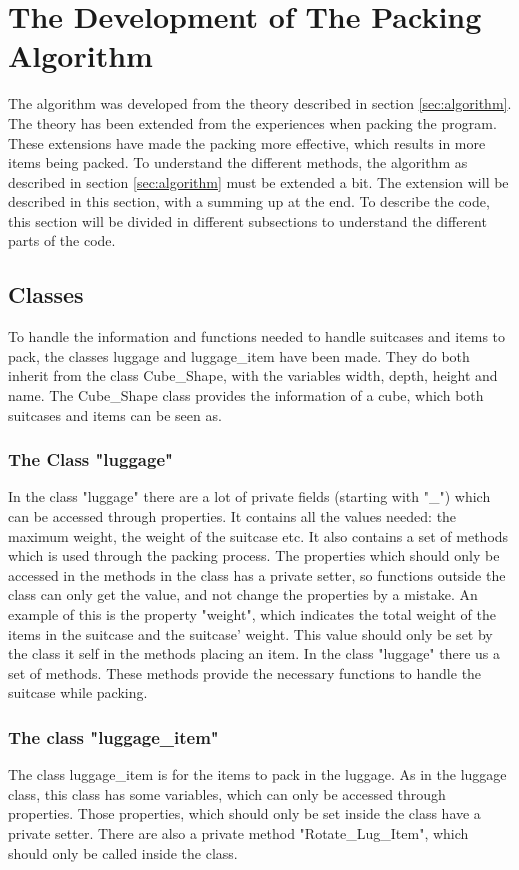 \section{The Development of The Packing Algorithm}
\label{sec:devalgorithm}
The algorithm was developed from the theory described in section \ref{sec:algorithm}. The theory has been extended from the experiences when packing the program. These extensions have made the packing more effective, which results in more items being packed. 
To understand the different methods, the algorithm as described in section \ref{sec:algorithm} must be extended a bit. The extension will be described in this section, with a summing up at the end. To describe the code, this section will be divided in different subsections to understand the different parts of the code.

\subsection{Classes}
To handle the information and functions needed to handle suitcases and items to pack, the classes luggage and luggage\_item have been made. They do both inherit from the class Cube\_Shape, with the variables width, depth, height and name. The Cube\_Shape class provides the information of a cube, which both suitcases and items can be seen as.
\subsubsection{The Class "luggage"}
In the class "luggage" there are a lot of private fields (starting with "\_") which can be accessed through properties. It contains all the values needed: the maximum weight, the weight of the suitcase etc. It also contains a set of methods which is used through the packing process. The properties which should only be accessed in the methods in the class has a private setter, so functions outside the class can only get the value, and not change the properties by a mistake. An example of this is the property "weight", which indicates the total weight of the items in the suitcase and the suitcase' weight. This value should only be set by the class it self in the methods placing an item.
In the class "luggage" there us a set of methods. These methods provide the necessary functions to handle the suitcase while packing.
\subsubsection{The class "luggage\_item"}
The class luggage\_item is for the items to pack in the luggage. As in the luggage class, this class has some variables, which can only be accessed through properties. Those properties, which should only be set inside the class have a private setter. There are also a private method "Rotate\_Lug\_Item", which should only be called inside the class.

